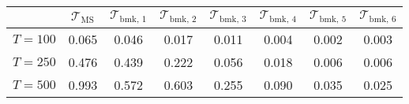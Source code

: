 % 
\begin{tabular}{cccccccc}
  \hline
  & $\mathcal{T}_{\text{MS}}$ & $\mathcal{T}_{\text{bmk, }1}$ & $\mathcal{T}_{\text{bmk, }2}$ & $\mathcal{T}_{\text{bmk, }3}$ & $\mathcal{T}_{\text{bmk, }4}$ & $\mathcal{T}_{\text{bmk, }5}$ & $\mathcal{T}_{\text{bmk, }6}$\\
 \hline
$T = 100$ & 0.065 & 0.046 & 0.017 & 0.011 & 0.004 & 0.002 & 0.003 \\ 
  $T = 250$ & 0.476 & 0.439 & 0.222 & 0.056 & 0.018 & 0.006 & 0.006 \\ 
  $T = 500$ & 0.993 & 0.572 & 0.603 & 0.255 & 0.090 & 0.035 & 0.025 \\ 
   \hline
\end{tabular}
